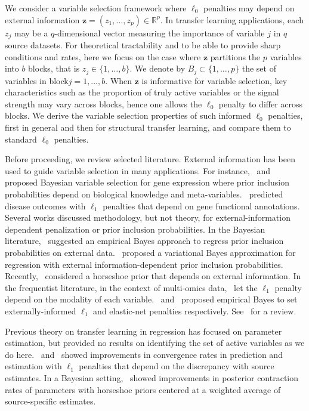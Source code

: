 \documentclass[
  12pt]{article}
\newcommand{\R}{\mathbb{R}}
\newcommand{\bz}{\boldsymbol{z}}
\begin{document}
We consider a variable selection framework where $\ell_0$ penalties may depend on external information $\bz=(z_1,\ldots,z_p) \in \R^p$. In transfer learning applications, each $z_j$ may be a $q$-dimensional vector measuring the importance of variable $j$ in $q$ source datasets. For theoretical tractability and to be able to provide sharp conditions and rates, here we focus on the case where $\bz$ partitions the $p$ variables into $b$ blocks, that is $z_j \in \{1,\ldots,b\}$.
We denote by $B_j \subset \{1,\ldots,p\}$ the set of variables in block$j=1,\ldots,b$.
When $\bz$ is informative for variable selection, key characteristics such as the proportion of truly active variables or the signal strength may vary across blocks, hence one allows the $\ell_0$ penalty to differ across blocks. 
We derive the variable selection properties of such informed $\ell_0$ penalties, first in general and then for structural transfer learning, and compare them to standard $\ell_0$ penalties.

Before proceeding, we review selected literature.
External information has been used to guide variable selection in many applications. For instance,~\cite{stingo:2011} and~\cite{cassese:2014} proposed Bayesian variable selection for gene expression where prior inclusion probabilities depend on biological knowledge and meta-variables.~\cite{chen_tinghuei:2021} predicted disease outcomes with $\ell_1$ penalties that depend on gene functional annotations. Several works discussed methodology, but not theory, for external-information dependent penalization or prior inclusion probabilities. In the Bayesian literature,~\cite{vandeWiel2019} suggested an empirical Bayes approach to regress prior inclusion probabilities on external data.~\cite{Velten2021} proposed a variational Bayes approximation for regression with external information-dependent prior inclusion probabilities. Recently,~\cite{busatto2023} considered a horseshoe prior that depends on external information. In the frequentist literature, in the context of multi-omics data,~\cite{Boulesteix2017} let the $\ell_1$ penalty depend on the modality of each variable.~\cite{Zeng2020} and~\cite{vanNee2023} proposed empirical Bayes to set externally-informed $\ell_1$ and elastic-net penalties respectively. See~\cite{vandewiel2024} for a review.

Previous theory on transfer learning in  regression has focused on parameter estimation, but provided no results on identifying the set of active variables as we do here.~\cite{Jiang2016} and~\cite{Li2021} showed improvements in convergence rates in prediction and estimation with $\ell_1$ penalties that depend on the discrepancy with source estimates. In a Bayesian setting,~\cite{lai2024} showed improvements in posterior contraction rates of parameters with horseshoe priors centered at a weighted average of source-specific estimates.
\end{document}
